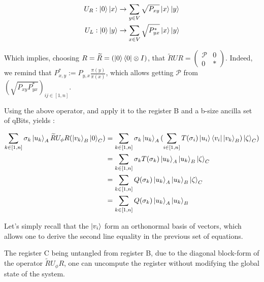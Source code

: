 \documentclass{article}
\begin{document}
\begin{align}
    U_R : \ket{0} \ket{x} &\rightarrow \sum_{y \in V} \sqrt{P_{xy}} \ket{x} \ket{y} \\
    U_L : \ket{0} \ket{y} &\rightarrow \sum_{x \in V} \sqrt{P^*_{yx}} \ket{x} \ket{y}
\end{align}

Which implies, choosing $R = \widetilde{R} = (\ket{0}\bra{0} \otimes I)$, that $\widetilde{R}UR = \begin{pmatrix} \mathcal{P} & 0 \\ 0 & * \end{pmatrix}$. Indeed, we remind that $P^*_{x,y} := P_{y,x} \frac{\pi(y)}{\pi(x)}$, which allows getting $\mathcal{P}$ from $(\sqrt{P_{xy}P^*_{yx}})_{ij \in [1,n]}$.

Using the above operator, and apply it to the register B and a b-size ancilla set of qBits, yields :

\begin{align}
    \sum_{k\in [1,n]} \sigma_k \ket{u_k}_A \widetilde{R}U_\phi R (\ket{v_k}_B \ket{0}_C) &= \sum_{k\in [1,n]} \sigma_k \ket{u_k}_A  (\sum_{i \in [1,n]} T(\sigma_i) \ket{u_i}\bra{v_i}\ket{v_k}_B) \ket{\zeta}_C )\\
    &= \sum_{k\in [1,n]} \sigma_k T(\sigma_k) \ket{u_k}_A  \ket{u_k}_B \ket{\zeta}_C \\
    &= \sum_{k\in [1,n]} Q(\sigma_k) \ket{u_k}_A  \ket{u_k}_B \ket{\zeta}_C \\
    &= \sum_{k\in [1,n]} Q(\sigma_k) \ket{u_k}_A  \ket{u_k}_B
\end{align}

Let's simply recall that the $\ket{v_i}$ form an orthonormal basis of vectors, which allows one to derive the second line equality in the previous set of equations.

The register C being untangled from register B, due to the diagonal block-form of the operator $\widetilde{R}U_\phi R$, one can uncompute the register without modifying the global state of the system.
\end{document}
